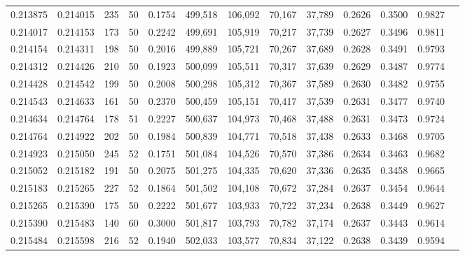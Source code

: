 \begin{tabular}{rrrrrrrrrrrrr}
0.213875 & 0.214015 &   235 &  50 &                                     0.1754 & 499,518 & 106,092 &  70,167 &  37,789 & 0.2626 & 0.3500 & 0.9827 \\
0.214017 & 0.214153 &   173 &  50 &                                     0.2242 & 499,691 & 105,919 &  70,217 &  37,739 & 0.2627 & 0.3496 & 0.9811 \\
0.214154 & 0.214311 &   198 &  50 &                                     0.2016 & 499,889 & 105,721 &  70,267 &  37,689 & 0.2628 & 0.3491 & 0.9793 \\
0.214312 & 0.214426 &   210 &  50 &                                     0.1923 & 500,099 & 105,511 &  70,317 &  37,639 & 0.2629 & 0.3487 & 0.9774 \\
0.214428 & 0.214542 &   199 &  50 &                                     0.2008 & 500,298 & 105,312 &  70,367 &  37,589 & 0.2630 & 0.3482 & 0.9755 \\
0.214543 & 0.214633 &   161 &  50 &                                     0.2370 & 500,459 & 105,151 &  70,417 &  37,539 & 0.2631 & 0.3477 & 0.9740 \\
0.214634 & 0.214764 &   178 &  51 &                                     0.2227 & 500,637 & 104,973 &  70,468 &  37,488 & 0.2631 & 0.3473 & 0.9724 \\
0.214764 & 0.214922 &   202 &  50 &                                     0.1984 & 500,839 & 104,771 &  70,518 &  37,438 & 0.2633 & 0.3468 & 0.9705 \\
0.214923 & 0.215050 &   245 &  52 &                                     0.1751 & 501,084 & 104,526 &  70,570 &  37,386 & 0.2634 & 0.3463 & 0.9682 \\
0.215052 & 0.215182 &   191 &  50 &                                     0.2075 & 501,275 & 104,335 &  70,620 &  37,336 & 0.2635 & 0.3458 & 0.9665 \\
0.215183 & 0.215265 &   227 &  52 &                                     0.1864 & 501,502 & 104,108 &  70,672 &  37,284 & 0.2637 & 0.3454 & 0.9644 \\
0.215265 & 0.215390 &   175 &  50 &                                     0.2222 & 501,677 & 103,933 &  70,722 &  37,234 & 0.2638 & 0.3449 & 0.9627 \\
0.215390 & 0.215483 &   140 &  60 &                                     0.3000 & 501,817 & 103,793 &  70,782 &  37,174 & 0.2637 & 0.3443 & 0.9614 \\
0.215484 & 0.215598 &   216 &  52 &                                     0.1940 & 502,033 & 103,577 &  70,834 &  37,122 & 0.2638 & 0.3439 & 0.9594 \\

\end{tabular}
